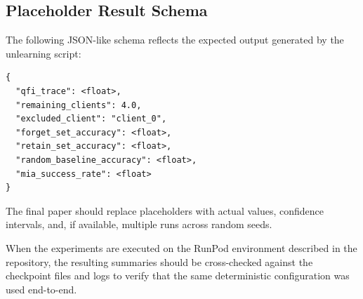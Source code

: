\subsection{Placeholder Result Schema}

The following JSON-like schema reflects the expected output generated by the unlearning script:

\begin{verbatim}
{
  "qfi_trace": <float>,
  "remaining_clients": 4.0,
  "excluded_client": "client_0",
  "forget_set_accuracy": <float>,
  "retain_set_accuracy": <float>,
  "random_baseline_accuracy": <float>,
  "mia_success_rate": <float>
}
\end{verbatim}

The final paper should replace placeholders with actual values, confidence intervals, and, if available, multiple runs across random seeds.

When the experiments are executed on the RunPod environment described in the repository, the resulting summaries should be cross-checked against the checkpoint files and logs to verify that the same deterministic configuration was used end-to-end.
